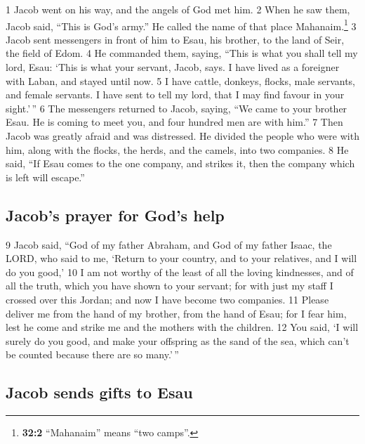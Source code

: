 {1} Jacob went on his way, and the angels of God met him. {2} When he
saw them, Jacob said, ``This is God's army.'' He called the name of that
place Mahanaim.\footnote{\textbf{32:2} ``Mahanaim'' means ``two camps''.}
{3} Jacob sent messengers in front of him to Esau, his brother, to the
land of Seir, the field of Edom. {4} He commanded them, saying, ``This
is what you shall tell my lord, Esau: `This is what your servant, Jacob,
says. I have lived as a foreigner with Laban, and stayed until now. {5}
I have cattle, donkeys, flocks, male servants, and female servants. I
have sent to tell my lord, that I may find favour in your sight.'\,''
{6} The messengers returned to Jacob, saying, ``We came to your brother
Esau. He is coming to meet you, and four hundred men are with him.'' {7}
Then Jacob was greatly afraid and was distressed. He divided the people
who were with him, along with the flocks, the herds, and the camels,
into two companies. {8} He said, ``If Esau comes to the one company, and
strikes it, then the company which is left will escape.''

\hypertarget{jacobs-prayer-for-gods-help}{%
\subsection{Jacob's prayer for God's
help}\label{jacobs-prayer-for-gods-help}}

{9} Jacob said, ``God of my father Abraham, and God of my father Isaac,
the LORD, who said to me, `Return to your country, and to your
relatives, and I will do you good,' {10} I am not worthy of the least of
all the loving kindnesses, and of all the truth, which you have shown to
your servant; for with just my staff I crossed over this Jordan; and now
I have become two companies. {11} Please deliver me from the hand of my
brother, from the hand of Esau; for I fear him, lest he come and strike
me and the mothers with the children. {12} You said, `I will surely do
you good, and make your offspring as the sand of the sea, which can't be
counted because there are so many.'\,''

\hypertarget{jacob-sends-gifts-to-esau}{%
\subsection{Jacob sends gifts to Esau}\label{jacob-sends-gifts-to-esau}}

